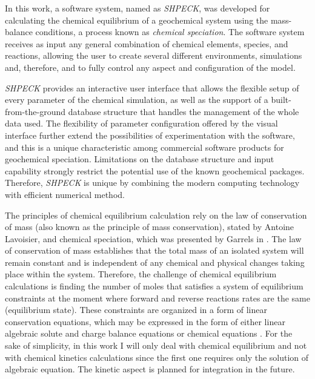 
In this work, a software system, named as \emph{SHPECK}, was developed for calculating the chemical equilibrium of a geochemical system using the mass-balance conditions, a  process known as \emph{chemical speciation}. The software system receives as input any general combination of chemical elements, species, and reactions, allowing the user to create several different environments, simulations and, therefore, and to fully control any aspect and configuration of the model. 

\emph{SHPECK} provides an interactive user interface that allows the flexible setup of every parameter of the chemical simulation, as well as the support of a built-from-the-ground database structure that handles the management of the whole data used.  The flexibility of parameter configuration offered by the visual interface further extend the possibilities of experimentation with the software, and this is a unique characteristic among commercial software products for geochemical speciation. Limitations on the database structure and input capability strongly restrict the potential use of the known geochemical packages. Therefore, \emph{SHPECK} is unique by combining the modern computing technology with efficient numerical method.


The principles of chemical equilibrium calculation rely on the law of conservation of mass (also known as the principle of mass conservation), stated by Antoine Lavoisier, and chemical speciation, which was presented by Garrels in \cite{Garrels:65}. 
The law of conservation of mass establishes that the total mass of an isolated system will remain constant and is independent of any chemical and physical changes taking place within the system. Therefore, the challenge of chemical equilibrium calculations is finding the number of moles that satisfies a system of equilibrium constraints at the moment where forward and reverse reactions rates are the same (equilibrium state). 
These constraints are organized in a form of linear conservation equations, which may be expressed in the form of either linear algebraic solute and charge balance equations or chemical equations \cite{SmithMissen83}. For the sake of simplicity, in this work I will only deal with chemical equilibrium and not with chemical kinetics calculations since the first one requires only the solution of algebraic equation. The kinetic aspect is planned for integration in the future.

